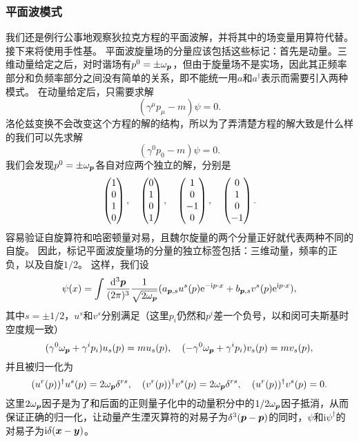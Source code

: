 \documentclass[hyperref, UTF8, a4paper]{ctexart}
\newcommand*{\ii}{\mathrm{i}}
\newcommand*{\ee}{\mathrm{e}}
\begin{document}
\subsubsection{平面波模式}

我们还是例行公事地观察狄拉克方程的平面波解，并将其中的场变量用算符代替。接下来将使用手性基。
平面波旋量场的分量应该包括这些标记：首先是动量。三维动量给定之后，对时谐场有$p^0 = \pm \omega_{\vb*{p}}$，但由于旋量场不是实场，因此其正频率部分和负频率部分之间没有简单的关系，即不能统一用$a$和$a^\dagger$表示而需要引入两种模式。
在动量给定后，只需要求解
\[
    (\gamma^\mu p_\mu - m) \psi = 0.
\]
洛伦兹变换不会改变这个方程的解的结构，所以为了弄清楚方程的解大致是什么样的我们可以先求解
\[
    (\gamma^0 p_0 - m) \psi = 0.
\]
我们会发现$p^0 = \pm \omega_{\vb*{p}}$各自对应两个独立的解，分别是
\[
    \pmqty{1 \\ 0 \\ 1 \\ 0}, \quad \pmqty{0 \\ 1 \\ 0 \\ 1}, \quad \pmqty{1 \\ 0 \\ -1 \\ 0}, \quad \pmqty{0 \\ 1 \\ 0 \\ -1}.
\]
容易验证自旋算符和哈密顿量对易，且魏尔旋量的两个分量正好就代表两种不同的自旋。
因此，标记平面波旋量场的分量的独立标签包括：三维动量，频率的正负，以及自旋$1/2$。
这样，我们设
\begin{equation}
    \psi(x) = \int \frac{\dd[3]{\vb*{p}}}{(2\pi)^3} \frac{1}{\sqrt{2 \omega_{\vb*{p}}}} (a_{\vb*{p}, s} u^s(p) \ee^{-\ii p \cdot x} + b_{\vb*{p}, s} v^s(p) \ee^{\ii p \cdot x}),
\end{equation}
其中$s = \pm 1/2$，$u^s$和$v^s$分别满足（这里$p_i$仍然和$p^i$差一个负号，以和闵可夫斯基时空度规一致）
\begin{equation}
    (\gamma^0 \omega_{\vb*{p}} + \gamma^i p_i) u_s(p) = m u_s(p), \quad (- \gamma^0 \omega_{\vb*{p}} + \gamma^i p_i) v_s(p) = m v_s(p), 
    \label{eq:u-v-eigen}
\end{equation}
并且被归一化为
\begin{equation}
    (u^r(p))^\dagger u^s(p) = 2 \omega_{\vb*{p}} \delta^{rs}, \quad (v^r(p))^\dagger v^s(p) = 2 \omega_{\vb*{p}} \delta^{rs}, \quad (u^r(p))^\dagger v^s(p) = 0.
    \label{eq:dirac-norm}
\end{equation}
这里$2\omega_{\vb*{p}}$因子是为了和后面的正则量子化中的动量积分中的$1/2\omega_{\vb*{p}}$因子抵消，从而保证正确的归一化，让动量产生湮灭算符的对易子为$\delta^3(\vb*{p} - \vb*{p})$的同时，$\psi$和$\ii \psi^\dagger$的对易子为$\ii \delta(\vb*{x} - \vb*{y})$。
\end{document}

